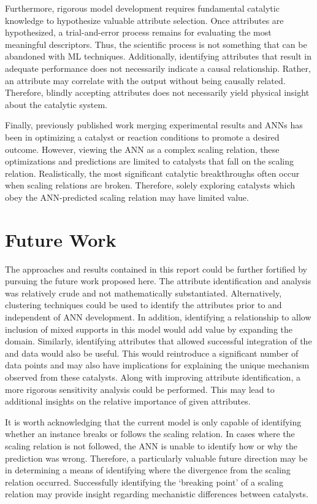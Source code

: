 Furthermore, rigorous model development requires fundamental catalytic knowledge to hypothesize valuable attribute selection. Once attributes are hypothesized, a trial-and-error process remains for evaluating the most meaningful descriptors. Thus, the scientific process is not something that can be abandoned with ML techniques. Additionally, identifying attributes that result in adequate performance does not necessarily indicate a causal relationship. Rather, an attribute may correlate with the output without being causally related. Therefore, blindly accepting attributes does not necessarily yield physical insight about the catalytic system.

Finally, previously published work merging experimental results and ANNs has been in optimizing a catalyst or reaction conditions to promote a desired outcome. However, viewing the ANN as a complex scaling relation, these optimizations and predictions are limited to catalysts that fall on the scaling relation. Realistically, the most significant catalytic breakthroughs often occur when scaling relations are broken. Therefore, solely exploring catalysts which obey the ANN-predicted scaling relation may have limited value. 
\section{Future Work}
The approaches and results contained in this report could be further fortified by pursuing the future work proposed here. The attribute identification and analysis was relatively crude and not mathematically substantiated. Alternatively, clustering techniques could be used to identify the attributes prior to and independent of ANN development. In addition, identifying a relationship to allow inclusion of mixed supports in this model would add value by expanding the domain. Similarly, identifying attributes that allowed successful integration of the  and  data would also be useful. This would reintroduce a significant number of data points and may also have implications for explaining the unique mechanism observed from these catalysts. Along with improving attribute identification, a more rigorous sensitivity analysis could be performed. This may lead to additional insights on the relative importance of given attributes.

It is worth acknowledging that the current model is only capable of identifying whether an instance breaks or follows the scaling relation. In cases where the scaling relation is not followed, the ANN is unable to identify how or why the prediction was wrong. Therefore, a particularly valuable future direction may be in determining a means of identifying where the divergence from the scaling relation occurred. Successfully identifying the `breaking point' of a scaling relation may provide insight regarding mechanistic differences between catalysts. 








